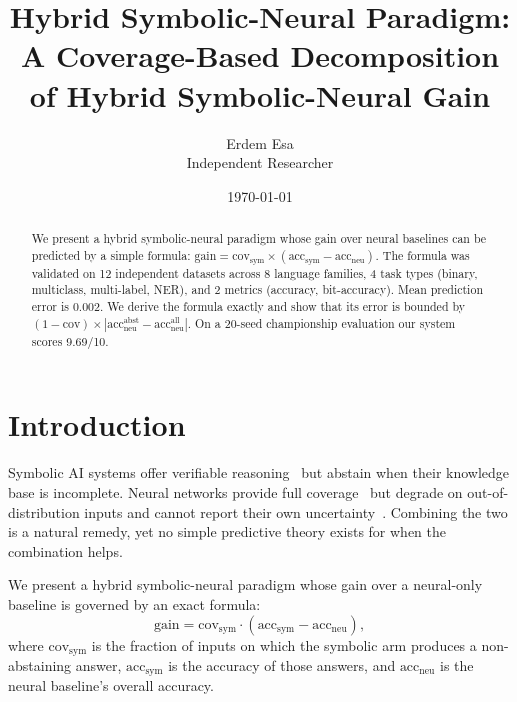 \documentclass[11pt,a4paper]{article}
\title{Hybrid Symbolic-Neural Paradigm:\\ A Coverage-Based Decomposition of Hybrid Symbolic-Neural Gain}
\author{Erdem Esa\\ \small Independent Researcher}
\date{\today}
\begin{document}
\maketitle

\begin{abstract}
We present a hybrid symbolic-neural paradigm whose gain over neural
baselines can be predicted by a simple formula:
$\text{gain} = \text{cov}_{\text{sym}} \times
(\text{acc}_{\text{sym}} - \text{acc}_{\text{neu}})$.
The formula was validated on 12 independent datasets across 8 language
families, 4 task types (binary, multiclass, multi-label, NER), and 2 metrics
(accuracy, bit-accuracy). Mean prediction error is 0.002. We derive the
formula exactly and show that its error is bounded by
$(1-\text{cov}) \times |\text{acc}_{\text{neu}}^{\text{abst}} -
\text{acc}_{\text{neu}}^{\text{all}}|$. On a 20-seed championship
evaluation our system scores 9.69/10.
\end{abstract}

\section{Introduction}
\label{sec:intro}
Symbolic AI systems offer verifiable reasoning~\cite{garcez2023neurosymbolic,
manhaeve2018deepproblog} but abstain when their knowledge base is
incomplete. Neural networks provide full coverage~\cite{vaswani2017attention}
but degrade on out-of-distribution inputs and cannot report their own
uncertainty~\cite{marcus2020next,bengio2021hybrid}. Combining the two is a natural remedy, yet no simple
predictive theory exists for when the combination helps.

We present a hybrid symbolic-neural paradigm whose gain over a
neural-only baseline is governed by an exact formula:
\begin{equation}
\label{eq:main}
\text{gain} = \text{cov}_{\text{sym}} \cdot
(\text{acc}_{\text{sym}} - \text{acc}_{\text{neu}}),
\end{equation}
where $\text{cov}_{\text{sym}}$ is the fraction of inputs on which the
symbolic arm produces a non-abstaining answer,
$\text{acc}_{\text{sym}}$ is the accuracy of those answers, and
$\text{acc}_{\text{neu}}$ is the neural baseline's overall accuracy.
\end{document}
